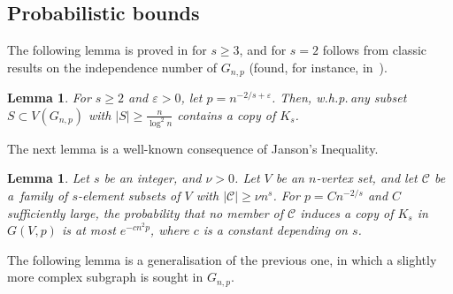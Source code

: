 \documentclass[reqno, 12pt]{amsart}
\numberwithin{equation}{section}
\numberwithin{figure}{section}
\theoremstyle{plain}
\newtheorem{lemma}[thm]{Lemma}
\theoremstyle{definition}
\let\eps=\varepsilon
\def\cC{{\mathcal C}}
\def \Gnp{G_{n,p}}
\begin{document}
	
    \subsection{Probabilistic bounds}

    The following lemma is proved in \cite{akr24} for $s\geq 3$, and for $s=2$ follows from classic results on the independence number of $\Gnp$ (found, for instance, in~\cite[Theorem 7.4]{jlr00}).

    \begin{lemma}\label{l:ks-in-lin-sized}
        For $s \geq 2$ and $\eps >0$, let  $p = n^{-2/s+\eps}$. Then, w.h.p.\,any subset $S \subset V(\Gnp)$ with $|S| \geq \frac{n}{\log^2 n}$ contains a copy of $K_s$.
    \end{lemma}

    The next lemma is a well-known consequence of Janson's Inequality.
    
    \begin{lemma}
	\label{l:akr:ks-s-everywhere}
        Let  $s$ be an integer, and $\nu >0$. Let $V$ be an $n$-vertex set, and let $\cC$ be a~family of $s$-element subsets of $V$ with $|\cC|\geq \nu n^{s}$. For $p = Cn^{-2/s}$ and $C$ sufficiently large, the probability that no member of $\cC$ induces a copy of $K_s$ in $G(V,p)$ is at most $e^{-c n^2 p}$, where $c$ is a constant depending on $s$.
    \end{lemma}

    The following lemma is a generalisation of the previous one, in which a slightly more complex subgraph is sought in $\Gnp$.
    
\end{document}
